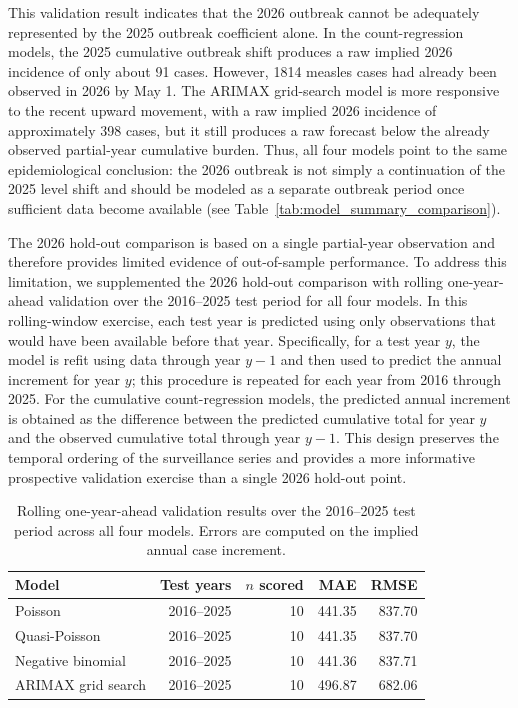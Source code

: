\documentclass[utf8]{FrontiersinHarvard} %
\begin{document}
This validation result indicates that the 2026 outbreak cannot be adequately represented by the 2025 outbreak coefficient alone. In the count-regression models, the 2025 cumulative outbreak shift produces a raw implied 2026 incidence of only about 91 cases. However, 1814 measles cases had already been observed in 2026 by May 1. The ARIMAX grid-search model is more responsive to the recent upward movement, with a raw implied 2026 incidence of approximately 398 cases, but it still produces a raw forecast below the already observed partial-year cumulative burden. Thus, all four models point to the same epidemiological conclusion: the 2026 outbreak is not simply a continuation of the 2025 level shift and should be modeled as a separate outbreak period once sufficient data become available (see Table~\ref{tab:model_summary_comparison}).

The 2026 hold-out comparison is based on a single partial-year observation and therefore provides limited evidence of out-of-sample performance. To address this limitation, we supplemented the 2026 hold-out comparison with rolling one-year-ahead validation over the 2016--2025 test period for all four models. In this rolling-window exercise, each test year is predicted using only observations that would have been available before that year. Specifically, for a test year $y$, the model is refit using data through year $y-1$ and then used to predict the annual increment for year $y$; this procedure is repeated for each year from 2016 through 2025. For the cumulative count-regression models, the predicted annual increment is obtained as the difference between the predicted cumulative total for year $y$ and the observed cumulative total through year $y-1$. This design preserves the temporal ordering of the surveillance series and provides a more informative prospective validation exercise than a single 2026 hold-out point.

\begin{table}[h!]
\centering
\caption{Rolling one-year-ahead validation results over the 2016--2025 test period across all four models. Errors are computed on the implied annual case increment.}
\label{tab:rolling_validation_summary}
\begin{tabular}{lrrrr}
\toprule
Model & Test years & $n$ scored & MAE & RMSE \\
\midrule
Poisson & 2016--2025 & 10 & 441.35 & 837.70 \\
Quasi-Poisson & 2016--2025 & 10 & 441.35 & 837.70 \\
Negative binomial & 2016--2025 & 10 & 441.36 & 837.71 \\
ARIMAX grid search & 2016--2025 & 10 & 496.87 & 682.06 \\
\bottomrule
\end{tabular}
\end{table}
\end{document}
